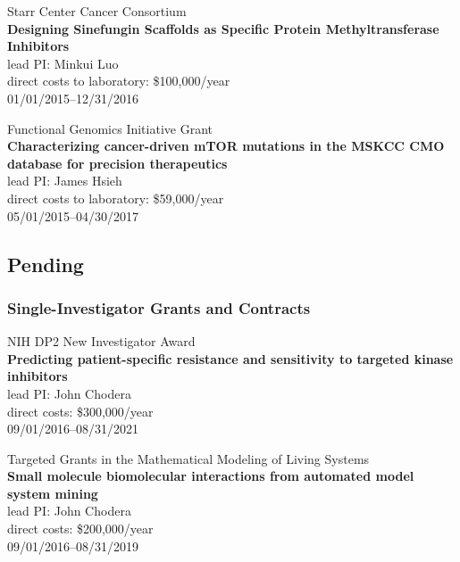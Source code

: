 \documentclass[10pt]{article}
\begin{document}
Starr Center Cancer Consortium\\
{\bf Designing Sinefungin Scaffolds as Specific Protein Methyltransferase Inhibitors}\\
lead PI: Minkui Luo\\
direct costs to laboratory: \$100,000/year \\
01/01/2015--12/31/2016

\vspace{2ex}

Functional Genomics Initiative Grant\\
{\bf Characterizing cancer-driven mTOR mutations in the MSKCC CMO database for precision therapeutics}\\
lead PI: James Hsieh\\
direct costs to laboratory: \$59,000/year \\
05/01/2015--04/30/2017

\eject
\subsection*{Pending}

\subsubsection*{Single-Investigator Grants and Contracts}


NIH DP2 New Investigator Award\\
{\bf Predicting patient-specific resistance and sensitivity to targeted kinase inhibitors}\\
lead PI: John Chodera\\
direct costs: \$300,000/year\\
09/01/2016--08/31/2021

\vspace{2ex}

Targeted Grants in the Mathematical Modeling of Living Systems\\
{\bf Small molecule biomolecular interactions from automated model system mining}\\
lead PI: John Chodera\\
direct costs: \$200,000/year\\
09/01/2016--08/31/2019
\end{document}
